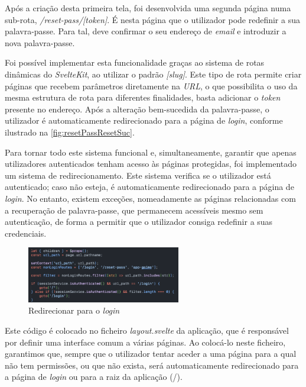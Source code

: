 Após a criação desta primeira tela, foi desenvolvida uma segunda página numa sub-rota, \textit{/reset-pass/[token]}. É nesta página que o utilizador pode redefinir a sua palavra-passe. Para tal, deve confirmar o seu endereço de \textit{email} e introduzir a nova palavra-passe.

Foi possível implementar esta funcionalidade graças ao sistema de rotas dinâmicas do \textit{SvelteKit}, ao utilizar o padrão \textit{[slug]}\cite{sveltekit.routing.url}. Este tipo de rota permite criar páginas que recebem parâmetros diretamente na \textit{URL}, o que possibilita o uso da mesma estrutura de rota para diferentes finalidades, basta adicionar o \textit{token} presente no endereço. Após a alteração bem-sucedida da palavra-passe, o utilizador é automaticamente redirecionado para a página de \textit{login}, conforme ilustrado na \autoref{fig:resetPassResetSuc}.

Para tornar todo este sistema funcional e, simultaneamente, garantir que apenas utilizadores autenticados tenham acesso às páginas protegidas, foi implementado um sistema de redirecionamento. Este sistema verifica se o utilizador está autenticado; caso não esteja, é automaticamente redirecionado para a página de \textit{login}. No entanto, existem exceções, nomeadamente as páginas relacionadas com a recuperação de palavra-passe, que permanecem acessíveis mesmo sem autenticação, de forma a permitir que o utilizador consiga redefinir a suas credenciais.

\begin{figure}[h!]
    \centering
    \includegraphics[width=0.6\textwidth]{figs/redirectLogin.png}
    \caption{Redirecionar para o \textit{login}}
    \label{fig:redirectLogin}
\end{figure}

Este código é colocado no ficheiro \textit{layout.svelte} da aplicação, que é responsável por definir uma interface comum a várias páginas. Ao colocá-lo neste ficheiro, garantimos que, sempre que o utilizador tentar aceder a uma página para a qual não tem permissões, ou que não exista, será automaticamente redirecionado para a página de \textit{login} ou para a raiz da aplicação (/).

